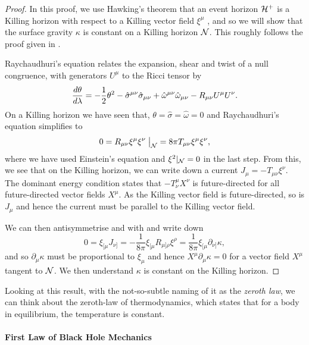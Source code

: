 \begin{proof}

In this proof, we use Hawking's theorem that an event horizon ${\cal H}^+$ is a Killing horizon with respect to a Killing vector field $\xi^\mu$ \cite{Hawking:1973uf}, and so we will show that the surface gravity $\kappa$ is constant on a Killing horizon ${\cal N}$. This roughly follows the proof given in \cite{Bardeen:1973gs}.

Raychaudhuri's equation \cite{Poisson:2009pwt} relates the expansion, shear and twist of a null congruence, with generators $U^\mu$ to the Ricci tensor by
\begin{equation*}
	\frac{d \theta}{d \lambda} = - \frac{1}{2} \theta^2 - \hat{\sigma}^{\mu \nu} \hat{\sigma}_{\mu \nu} + \hat{\omega}^{\mu \nu} \hat{\omega}_{\mu \nu} - R_{\mu \nu} U^{\mu} U^{\nu}.
\end{equation*}
On a Killing horizon we have seen that, $\theta = \hat{\sigma} = \hat{\omega} = 0$ and Raychaudhuri’s equation simplifies to
\begin{equation*}
	0 = R_{\mu \nu} \xi^\mu \xi^\nu \; \big|_{{\cal N}} = 8\pi T_{\mu \nu} \xi^\mu \xi^\nu,
\end{equation*}
where we have used Einstein's equation and $\xi^2 |_{{\cal N}} = 0$ in the last step. From this, we see that on the Killing horizon, we can write down a current $J_\mu = - T_{\mu \nu} \xi^\nu$. The dominant energy condition states that $- T^{\mu}_{\nu} X^\nu$ is future-directed for all future-directed vector fields $X^\mu$. As the Killing vector field is future-directed, so is $J_\mu$ and hence the current must be parallel to the Killing vector field.

We can then antisymmetrise and with  and write down
\begin{equation*}
	0 = \xi_{[\mu} J_{\nu]} =- \frac{1}{8\pi} \xi_{[\mu} R_{\mu] \rho} \xi^\rho  = \frac{1}{8 \pi} \xi_{[\mu} \partial_{\nu ]} \kappa,
\end{equation*}
and so $\partial_\mu \kappa$ must be proportional to $\xi_\mu$ and hence $X^\mu \partial_\mu \kappa = 0$ for a vector field $X^\mu$ tangent to ${\cal N}$. We then understand $\kappa$ is constant on the Killing horizon. 
\end{proof}

Looking at this result, with the not-so-subtle naming of it as the \emph{zeroth law}, we can think about the zeroth-law of thermodynamics, which states that for a body in equilibrium, the temperature is constant.

\paragraph{First Law of Black Hole Mechanics}

